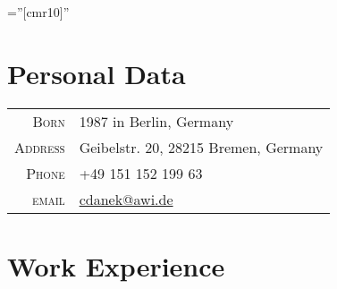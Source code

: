 \documentclass[a4paper,10pt]{article} %
\newcommand{\orcid}[1]{\href{https://orcid.org/#1}{\textcolor[HTML]{A6CE39}{\aiOrcid}}}
\begin{document}

\font\fb=''[cmr10]'' %

\par{\bigskip \qquad \LARGE \orcid{0000-0002-4453-1140} \LARGE \href{https://github.com/chrisdane}{\color{black}\faGithub} \href{https://stackoverflow.com/users/5098273/chris}{\color{black}\faStackOverflow} \par}
\vspace{0.1cm}

\section{Personal Data}
\vspace{0.3cm}

\begin{center}
\begin{tabular}{rl}
\textsc{Born} & 1987 in Berlin, Germany\\
\textsc{Address} & Geibelstr. 20, 28215 Bremen, Germany \\
\textsc{Phone} & +49 151 152 199 63\\
\textsc{email} & \href{mailto:cdanek@awi.de}{cdanek@awi.de}
\end{tabular}
\end{center}

\vspace{0.3cm}
\section{Work Experience}
\vspace{0.3cm}
\end{document}
